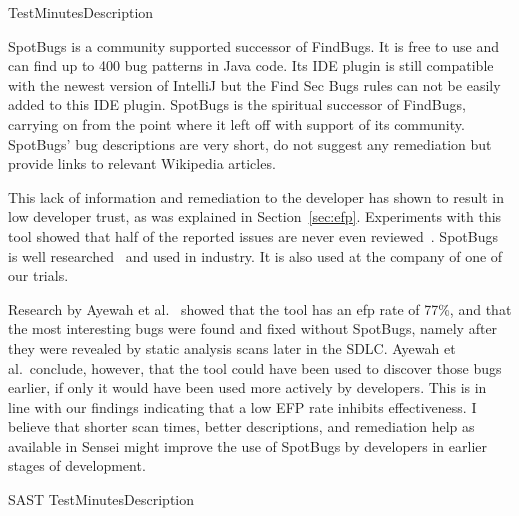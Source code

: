 
{Test}{Minutes}{Description}

{
\label{bc:SpotBugs}
SpotBugs is a community supported successor of FindBugs.
It is free to use and can find up to 400 bug patterns in Java code.
Its IDE plugin is still compatible with the newest version of IntelliJ but the Find Sec Bugs rules can not be easily added to this IDE plugin.
SpotBugs is the spiritual successor of FindBugs, carrying on from the point where it left off with support of its community.
SpotBugs' bug descriptions are very short, do not suggest any remediation but provide links to relevant Wikipedia articles. 

This lack of information and remediation to the developer has shown to result in low developer trust, as was explained in Section~\ref{sec:efp}.
Experiments with this tool showed that half of the reported issues are never even reviewed~\cite{ayewah2007using}.
SpotBugs is well researched~\cite{ayewah2007using,ayewah2010google,findbugs2008} and used in industry.
It is also used at the company of one of our trials.

Research by Ayewah et al.~\cite{ayewah2007using} showed that the tool has an \gls{efp} rate of 77\%, and that the most interesting bugs were found and fixed without SpotBugs, namely after they were revealed by static analysis scans later in the SDLC. Ayewah et al.\ conclude, however, that the tool could have been used to discover those bugs earlier, if only it would have been used more actively by developers. This is in line with our findings indicating that a low EFP rate inhibits effectiveness. I believe that shorter scan times, better descriptions, and remediation help as available in Sensei might improve the use of SpotBugs by developers in earlier stages of development.
}{SAST}
{Test}{Minutes}{Description}

